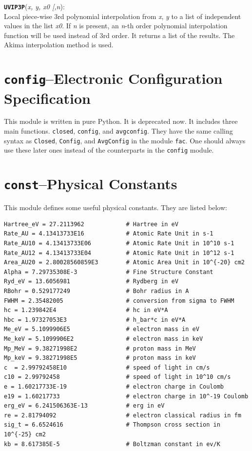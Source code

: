 \documentclass[twoside,letterpaper]{refrep}
\newcommand{\opt}[1]{
  {\textnormal{[}}{#1}\hspace{0.5mm}{\textnormal{]}}}
\newcommand{\var}[1]{\textit{#1}}
\newcommand{\key}[1]{\texttt{#1}}
\newcommand{\mod}[1]{\texttt{#1}}
\newenvironment{fundesc}[2]{
	\begin{center}
	\begin{minipage}{\textwidth}
	\index{#1}
	\addcontentsline{toc}{subsubsection}{#1}
	\key{\textbf{#1}}(\var{#2}):\\}
	{\end{minipage}\end{center}}
\begin{document}
\begin{fundesc}{UVIP3P}{x, y, x0\opt{,n}}
Local piece-wise 3rd polynomial interpolation from \var{x}, \var{y} to a list
of independent values in the list \var{x0}. If \var{n} is present, an
\var{n}-th order polynomial interpolation function will be used instead of 3rd
order. It returns a list of the results. The Akima interpolation method is
used.
\end{fundesc}

\section{\mod{config}--Electronic Configuration Specification}
\label{sec:config}
This module is written in pure Python. It is deprecated now. It includes three
main functions. \key{closed}, \key{config}, and \key{avgconfig}. They have the
same calling syntax as \key{Closed}, \key{Config}, and
\key{AvgConfig} in the module \mod{fac}. One should always use these later
ones instead of the counterparts in the \mod{config} module.

\section{\mod{const}--Physical Constants}
\label{sec:const}
This module defines some useful physical constants. They are listed below:
\begin{verbatim}
Hartree_eV = 27.2113962            # Hartree in eV   
Rate_AU = 4.13413733E16            # Atomic Rate Unit in s-1
Rate_AU10 = 4.13413733E06          # Atomic Rate Unit in 10^10 s-1
Rate_AU12 = 4.13413733E04          # Atomic Rate Unit in 10^12 s-1
Area_AU20 = 2.80028560859E3        # Atomic Area Unit in 10^{-20} cm2
Alpha = 7.29735308E-3              # Fine Structure Constant
Ryd_eV = 13.6056981                # Rydberg in eV
RBohr = 0.529177249                # Bohr radius in A
FWHM = 2.35482005                  # conversion from sigma to FWHM
hc = 1.239842E4                    # hc in eV*A
hbc = 1.97327053E3                 # h_bar*c in eV*A
Me_eV = 5.1099906E5                # electron mass in eV
Me_keV = 5.1099906E2               # electron mass in keV
Mp_MeV = 9.38271998E2              # proton mass in MeV
Mp_keV = 9.38271998E5              # proton mass in keV
c  = 2.99792458E10                 # speed of light in cm/s
c10 = 2.99792458                   # speed of light in 10^10 cm/s
e = 1.60217733E-19                 # electron charge in Coulomb
e19 = 1.60217733                   # electron charge in 10^-19 Coulomb
erg_eV = 6.241506363E-13           # erg in eV
re = 2.81794092                    # electron classical radius in fm
sig_t = 6.6524616                  # Thompson cross section in 10^{-25} cm2
kb = 8.617385E-5                   # Boltzman constant in ev/K
\end{verbatim}
\end{document}

